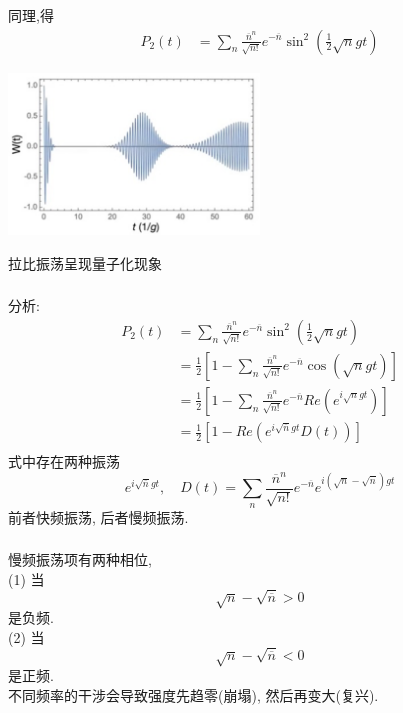     \begin{frame} 
    \frametitle{}
         同理,得
         \[\begin{aligned}
            P_2(t) &= \sum_n  \frac{\overline{n}^n}{\sqrt{n!}} e^{-\overline{n}} \sin ^2 (\frac{1}{2} \sqrt{n} g t) 
   \end{aligned} \]
      \begin{center}
           \includegraphics[width=0.5\textwidth]{figs/29.png}
      \end{center}
      拉比振荡呈现量子化现象
    \end{frame}

\begin{frame} 
\frametitle{}
    分析:
\[\begin{aligned}
    P_2(t) &= \sum_n  \frac{\overline{n} ^n}{\sqrt{n!}} e^{-\overline{n}} \sin ^2 (\frac{1}{2} \sqrt{n} g t) \\ 
    &= \frac{1}{2} \left[ 1 - \sum_n  \frac{\overline{n}^n}{\sqrt{n!}} e^{-\overline{n}} \cos (\sqrt{n} g t) \right] \\ 
    &= \frac{1}{2} \left[ 1 - \sum_n  \frac{\overline{n}^n}{\sqrt{n!}} e^{-\overline{n}} Re(e^{i\sqrt{n} g t}) \right] \\ 
    &= \frac{1}{2} \left[ 1 - Re(e^{i\sqrt{\overline{n}} g t} D(t)) \right] \\ 
\end{aligned} \] 
式中存在两种振荡
\[ e^{i\sqrt{\overline{n}} g t}, \quad D(t) =  \sum_n  \frac{\overline{n}^n}{\sqrt{n!}} e^{-\overline{n}} e^{i(\sqrt{n}-\sqrt{\overline{n}}) g t}\]
前者快频振荡, 后者慢频振荡. 
\end{frame}

\begin{frame} 
\frametitle{}
慢频振荡项有两种相位, \\ 
     (1) 当 
     \[\sqrt{n}-\sqrt{\overline{n}}> 0\]
    是负频. \\ 
    (2) 当 
    \[\sqrt{n}-\sqrt{\overline{n}}< 0\]
    是正频.\\ 
   不同频率的干涉会导致强度先趋零(崩塌), 然后再变大(复兴).
\end{frame}

